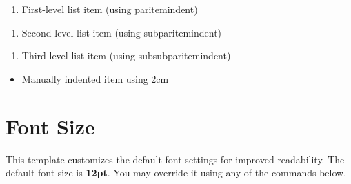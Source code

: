 \documentclass{VISTEC}
\begin{document}
\begin{tcolorbox}[colback=white, colframe=black, sharp corners, boxrule=0.4pt]
\begin{enumerate}[itemindent=\paritemindent]
  \item First-level list item (using paritemindent)
\end{enumerate}

\begin{enumerate}[itemindent=\subparitemindent]
  \item Second-level list item (using subparitemindent)
\end{enumerate}

\begin{enumerate}[itemindent=\subsubparitemindent]
  \item Third-level list item (using subsubparitemindent)
\end{enumerate}

\begin{itemize}[itemindent=2cm]
  \item Manually indented item using 2cm
\end{itemize}

\end{tcolorbox}





\section{Font Size}
\label{manual:font-size}

\begin{paragraph}
This template customizes the default font settings for improved readability. The default font size is \textbf{12pt}. You may override it using any of the commands below.
\end{paragraph}
\end{document}
